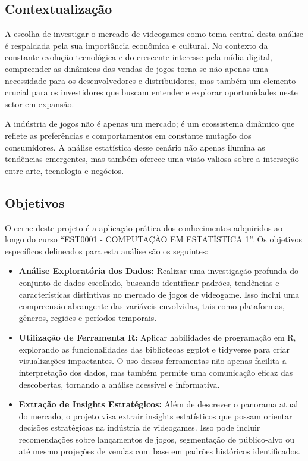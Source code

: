 \documentclass[draft]{agujournal2018}
\begin{document}
\subsection{Contextualização}

A escolha de investigar o mercado de videogames como tema central desta
análise é respaldada pela sua importância econômica e cultural. No
contexto da constante evolução tecnológica e do crescente interesse pela
mídia digital, compreender as dinâmicas das vendas de jogos torna-se não
apenas uma necessidade para os desenvolvedores e distribuidores, mas
também um elemento crucial para os investidores que buscam entender e
explorar oportunidades neste setor em expansão.

A indústria de jogos não é apenas um mercado; é um ecossistema dinâmico
que reflete as preferências e comportamentos em constante mutação dos
consumidores. A análise estatística desse cenário não apenas ilumina as
tendências emergentes, mas também oferece uma visão valiosa sobre a
interseção entre arte, tecnologia e negócios.

\subsection{Objetivos}

O cerne deste projeto é a aplicação prática dos conhecimentos adquiridos
ao longo do curso ``EST0001 - COMPUTAÇÃO EM ESTATÍSTICA 1''. Os
objetivos específicos delineados para esta análise são os seguintes:

\begin{itemize}
  \item \textbf{Análise Exploratória dos Dados: } Realizar uma investigação profunda do conjunto de dados escolhido, buscando identificar padrões, tendências e características distintivas no mercado de jogos de videogame. Isso inclui uma compreensão abrangente das variáveis envolvidas, tais como plataformas, gêneros, regiões e períodos temporais.  
  
  \item \textbf{Utilização de Ferramenta R: } Aplicar habilidades de programação em R, explorando as funcionalidades das bibliotecas ggplot e tidyverse para criar visualizações impactantes. O uso dessas ferramentas não apenas facilita a interpretação dos dados, mas também permite uma comunicação eficaz das descobertas, tornando a análise acessível e informativa.  
  
  \item \textbf{Extração de Insights Estratégicos: } Além de descrever o panorama atual do mercado, o projeto visa extrair insights estatísticos que possam orientar decisões estratégicas na indústria de videogames. Isso pode incluir recomendações sobre lançamentos de jogos, segmentação de público-alvo ou até mesmo projeções de vendas com base em padrões históricos identificados.

\end{itemize}
\end{document}
